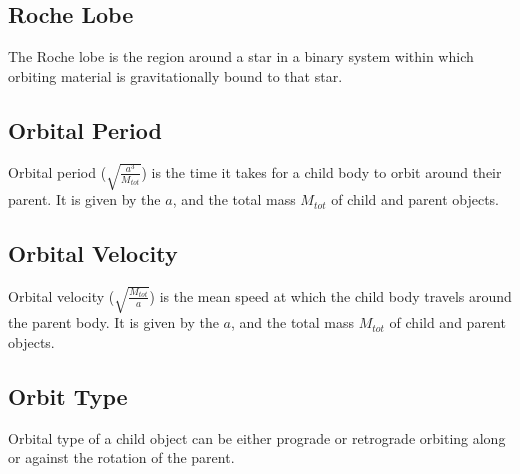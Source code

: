 \documentclass[letterpaper,10pt,english]{sphinxmanual}
\begin{document}
\subsection{Roche Lobe}
\label{\detokenize{quantities/orbital/roche_lobe:roche-lobe}}\label{\detokenize{quantities/orbital/roche_lobe::doc}}\label{\detokenize{quantities/orbital/roche_lobe:id1}}
\sphinxAtStartPar
The Roche lobe is the region around a star in a binary system within which orbiting material is gravitationally bound
to that star.


\subsection{Orbital Period}
\label{\detokenize{quantities/orbital/orbital_period:orbital-period}}\label{\detokenize{quantities/orbital/orbital_period::doc}}\label{\detokenize{quantities/orbital/orbital_period:id1}}
\sphinxAtStartPar
Orbital period (\(\sqrt{\frac{a^3}{M_{tot}}}\)) is the time it takes for a child body to orbit around their parent.
It is given by the {\hyperref[\detokenize{quantities/orbital/semi_major_axis:id1}]{}} \(a\), and the total mass \(M_{tot}\) of child
and parent objects.


\subsection{Orbital Velocity}
\label{\detokenize{quantities/orbital/orbital_velocity:orbital-velocity}}\label{\detokenize{quantities/orbital/orbital_velocity::doc}}\label{\detokenize{quantities/orbital/orbital_velocity:id1}}
\sphinxAtStartPar
Orbital velocity (\(\sqrt{\frac{M_{tot}}{a}}\)) is the mean speed at which the child body
travels around the parent body. It is given by the {\hyperref[\detokenize{quantities/orbital/semi_major_axis:id1}]{}} \(a\), and the
total mass \(M_{tot}\) of child and parent objects.


\subsection{Orbit Type}
\label{\detokenize{quantities/orbital/orbit_type:orbit-type}}\label{\detokenize{quantities/orbital/orbit_type::doc}}\label{\detokenize{quantities/orbital/orbit_type:id1}}
\sphinxAtStartPar
Orbital type of a child object can be either prograde or retrograde \sphinxhyphen{} orbiting
along or against the rotation of the parent.
\end{document}
